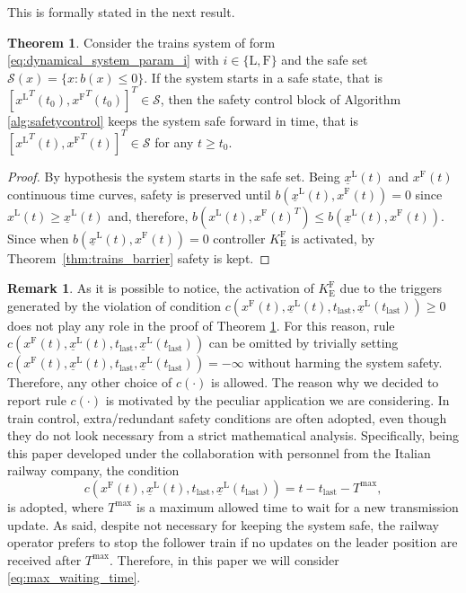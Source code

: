 \documentclass[letterpaper, 10 pt, conference]{ieeeconf}
\theoremstyle{definition}
\theoremstyle{nopoint}
\newtheorem*{remark}{Remark}
\newtheorem{theorem}{Theorem}[section]
\newcounter{Theorem}
\newcommand{\tildeAdd}{~}
\begin{document}
This is formally stated in the next result. 


\begin{theorem}\label{thm:safetycontrol} 
Consider the trains system of form \eqref{eq:dynamical_system_param_i} with $i\in\{\mathrm{L},\mathrm{F}\}$ and the safe set $\mathcal{S}(x)=\{x: b(x)\leq 0\}$. 
If the system starts in a safe state, that is $[{x^\mathrm{L}}^T(t_0),{x^\mathrm{F}}^T(t_0)]^T\in\mathcal{S}$, then the safety control block of Algorithm \ref{alg:safetycontrol} keeps the system safe forward in time, that is $[{x^\mathrm{L}}^T(t),{x^\mathrm{F}}^T(t)]^T\in\mathcal{S}$ for any $t\geq t_0$.
\begin{proof}
By hypothesis the system starts in the safe set. Being $\underline{x}^\mathrm{L}(t)$ and ${x^\mathrm{F}}(t)$ continuous time curves,  safety is preserved until $b({\underline{x}^\mathrm{L}}(t),{x^\mathrm{F}}(t))=0$ since $x^\mathrm{L}(t)\geq  \underline{x}^\mathrm{L}(t)$ and, therefore,  $b({x^\mathrm{L}}(t),{x^\mathrm{F}}(t)^T)\leq b({\underline{x}^\mathrm{L}}(t),{x^\mathrm{F}}(t))$. Since when $b({\underline{x}^\mathrm{L}}(t),{x^\mathrm{F}}(t))=0$ controller $K_\mathrm{E}^\mathrm{F}$ is activated, by Theorem\tildeAdd\ref{thm:trains_barrier} safety is kept. 
\end{proof}
\end{theorem}

\begin{remark}
As it is possible to notice, the activation of $K_\mathrm{E}^\mathrm{F}$ due to the triggers generated by 
the violation of condition $c(x^\mathrm{F}(t),\underline{x}^\mathrm{L}(t),t_{\mathrm{last}},\underline{x}^\mathrm{L}(t_{\mathrm{last}})) \geq 0$
does not play any role in the proof of Theorem \ref{thm:safetycontrol}. For this reason, rule $c(x^\mathrm{F}(t),\underline{x}^\mathrm{L}(t),t_{\mathrm{last}},\underline{x}^\mathrm{L}(t_{\mathrm{last}}))$ can be omitted by trivially setting $c(x^\mathrm{F}(t),\underline{x}^\mathrm{L}(t),t_{\mathrm{last}},\underline{x}^\mathrm{L}(t_{\mathrm{last}}))=-\infty$ without harming the system safety. Therefore, any other choice of $c(\cdot)$ is allowed. 
The reason why we decided to report rule $c(\cdot)$ is motivated by the peculiar application we are considering. In train control, extra/redundant safety conditions are often adopted, even though they do not look necessary from a strict mathematical analysis. 
Specifically, being this paper developed under the collaboration with personnel from the Italian railway company, the condition
\begin{equation}\label{eq:max_waiting_time}
c(x^\mathrm{F}(t),\underline{x}^\mathrm{L}(t),t_{\mathrm{last}},\underline{x}^\mathrm{L}(t_{\mathrm{last}}))= t-t_{\mathrm{last}}-T^{\max},
\end{equation}
is adopted, where $T^{\max}$ is a maximum allowed time to wait for a new transmission update. 
As said, despite not necessary for keeping the system safe, the railway operator prefers to stop the follower train if no updates on the leader position are received after $T^{\max}$. Therefore, in this paper we will consider \eqref{eq:max_waiting_time}.
\end{remark}
\end{document}
